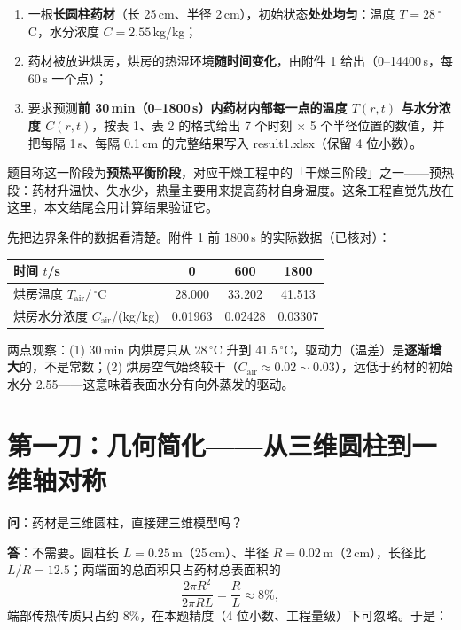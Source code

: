 \documentclass[12pt,a4paper]{ctexart}
\begin{document}
\begin{enumerate}[leftmargin=2.5em]
\item 一根\textbf{长圆柱药材}（长 25\,cm、半径 2\,cm），初始状态\textbf{处处均匀}：温度 $T=28\,^\circ$C，水分浓度 $C=2.55$\,kg/kg；
\item 药材被放进烘房，烘房的热湿环境\textbf{随时间变化}，由附件 1 给出（0--14400\,s，每 60\,s 一个点）；
\item 要求预测\textbf{前 30\,min（0--1800\,s）内药材内部每一点的温度 $T(r,t)$ 与水分浓度 $C(r,t)$}，按表 1、表 2 的格式给出 7 个时刻 $\times$ 5 个半径位置的数值，并把每隔 1\,s、每隔 0.1\,cm 的完整结果写入 result1.xlsx（保留 4 位小数）。
\end{enumerate}

题目称这一阶段为\textbf{预热平衡阶段}，对应干燥工程中的「干燥三阶段」之一——预热段：药材升温快、失水少，热量主要用来提高药材自身温度。这条工程直觉先放在这里，本文结尾会用计算结果验证它。

先把边界条件的数据看清楚。附件 1 前 1800\,s 的实际数据（已核对）：

\begin{center}
\begin{tabular}{lccc}
\toprule
时间 $t$/s & 0 & 600 & 1800 \\
\midrule
烘房温度 $T_{\mathrm{air}}/\,^\circ$C & 28.000 & 33.202 & 41.513 \\
烘房水分浓度 $C_{\mathrm{air}}$/(kg/kg) & 0.01963 & 0.02428 & 0.03307 \\
\bottomrule
\end{tabular}
\end{center}

两点观察：(1) 30\,min 内烘房只从 28\,$^\circ$C 升到 41.5\,$^\circ$C，驱动力（温差）是\textbf{逐渐增大}的，不是常数；(2) 烘房空气始终较干（$C_{\mathrm{air}}\approx0.02\sim0.03$），远低于药材的初始水分 2.55——这意味着表面水分有向外蒸发的驱动。

\section{第一刀：几何简化——从三维圆柱到一维轴对称}

\textbf{问}：药材是三维圆柱，直接建三维模型吗？

\textbf{答}：不需要。圆柱长 $L=0.25$\,m（25\,cm）、半径 $R=0.02$\,m（2\,cm），长径比 $L/R=12.5$；两端面的总面积只占药材总表面积的
\[
\frac{2\pi R^2}{2\pi RL}=\frac{R}{L}\approx 8\%,
\]
端部传热传质只占约 $8\%$，在本题精度（4 位小数、工程量级）下可忽略。于是：
\end{document}
